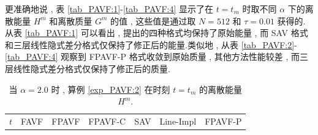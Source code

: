 \newpage
	更准确地说 , 表 \ref{tab_PAVF:1}-\ref{tab_PAVF:4} 显示了在 $t=t_{m}$ 时取不同 $\alpha$ 下的离散能量 $H^{m}$ 和离散质量 $G^{m}$ 的值 , 
	这些值是通过取 $N=512$ 和 $\tau=0.01$ 获得的.从表 \ref{tab_PAVF:1} 可以看出 , 提出的四种格式均保持了原始能量 , 
	而 SAV 格式和三层线性隐式差分格式仅保持了修正后的能量.类似地 , 从表 \ref{tab_PAVF:2}-\ref{tab_PAVF:4} 观察到 FPAVF-P 格式收敛到原始质量 , 其他方法性能较差 , 而三层线性隐式差分格式仅保持了修正后的质量.

\begin{table}[H]\footnotesize
	\centering
	\caption{当 $\alpha=2.0$ 时 , 算例 \ref{exp_PAVF:2}  在时刻 $t=t_{m}$ 的离散能量 $H^{m}$.}

	  \begin{tabular}{lllllll}
	  \toprule
       $t$   &FAVF   &FPAVF   &FPAVF-C   &SAV    &Line-Impl   &FPAVF-P\\

\end{tabular}
\end{table}
